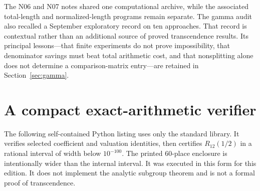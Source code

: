 \documentclass[11pt,a4paper]{article}
\numberwithin{equation}{section}
\theoremstyle{definition}
\theoremstyle{remark}
\begin{document}
The N06 and N07 notes shared one computational archive, while the
associated total-length and normalized-length programs remain separate.
The gamma audit also recalled a September exploratory record on ten
approaches. That record is contextual rather than an additional source of
proved transcendence results. Its principal lessons---that finite
experiments do not prove impossibility, that denominator savings must
beat total arithmetic cost, and that nonsplitting alone does not determine
a comparison-matrix entry---are retained in Section~\ref{sec:gamma}.

\section{A compact exact-arithmetic verifier}\label{app:code}
The following self-contained Python listing uses only the standard library.
It verifies selected coefficient and valuation identities, then certifies
$R_{12}(1/2)$ in a rational interval of width below $10^{-100}$. The printed
60-place enclosure is intentionally wider than the internal interval.
It was executed in this form for this edition. It does not implement the
analytic subgroup theorem and is not a formal proof of transcendence.
\end{document}
